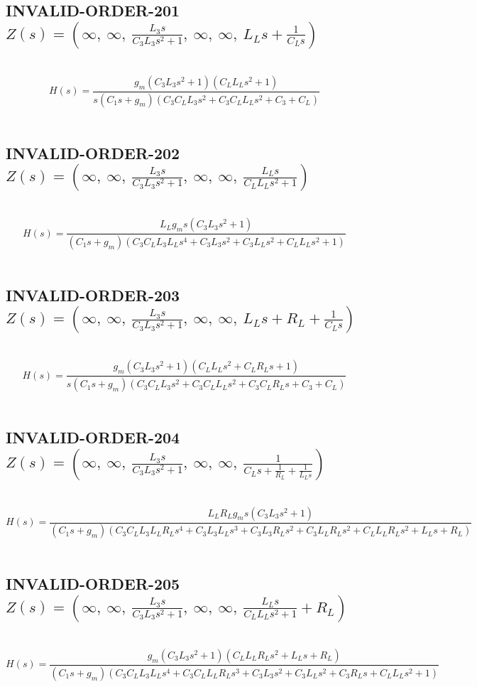 \documentclass{article}
\begin{document}
\subsection{INVALID-ORDER-201 $Z(s) = \left( \infty, \  \infty, \  \frac{L_{3} s}{C_{3} L_{3} s^{2} + 1}, \  \infty, \  \infty, \  L_{L} s + \frac{1}{C_{L} s}\right)$ } \ 
\textbf{\[H(s) = \frac{g_{m} \left(C_{3} L_{3} s^{2} + 1\right) \left(C_{L} L_{L} s^{2} + 1\right)}{s \left(C_{1} s + g_{m}\right) \left(C_{3} C_{L} L_{3} s^{2} + C_{3} C_{L} L_{L} s^{2} + C_{3} + C_{L}\right)}\] } \ 
\subsection{INVALID-ORDER-202 $Z(s) = \left( \infty, \  \infty, \  \frac{L_{3} s}{C_{3} L_{3} s^{2} + 1}, \  \infty, \  \infty, \  \frac{L_{L} s}{C_{L} L_{L} s^{2} + 1}\right)$ } \ 
\textbf{\[H(s) = \frac{L_{L} g_{m} s \left(C_{3} L_{3} s^{2} + 1\right)}{\left(C_{1} s + g_{m}\right) \left(C_{3} C_{L} L_{3} L_{L} s^{4} + C_{3} L_{3} s^{2} + C_{3} L_{L} s^{2} + C_{L} L_{L} s^{2} + 1\right)}\] } \ 
\subsection{INVALID-ORDER-203 $Z(s) = \left( \infty, \  \infty, \  \frac{L_{3} s}{C_{3} L_{3} s^{2} + 1}, \  \infty, \  \infty, \  L_{L} s + R_{L} + \frac{1}{C_{L} s}\right)$ } \ 
\textbf{\[H(s) = \frac{g_{m} \left(C_{3} L_{3} s^{2} + 1\right) \left(C_{L} L_{L} s^{2} + C_{L} R_{L} s + 1\right)}{s \left(C_{1} s + g_{m}\right) \left(C_{3} C_{L} L_{3} s^{2} + C_{3} C_{L} L_{L} s^{2} + C_{3} C_{L} R_{L} s + C_{3} + C_{L}\right)}\] } \ 
\subsection{INVALID-ORDER-204 $Z(s) = \left( \infty, \  \infty, \  \frac{L_{3} s}{C_{3} L_{3} s^{2} + 1}, \  \infty, \  \infty, \  \frac{1}{C_{L} s + \frac{1}{R_{L}} + \frac{1}{L_{L} s}}\right)$ } \ 
\textbf{\[H(s) = \frac{L_{L} R_{L} g_{m} s \left(C_{3} L_{3} s^{2} + 1\right)}{\left(C_{1} s + g_{m}\right) \left(C_{3} C_{L} L_{3} L_{L} R_{L} s^{4} + C_{3} L_{3} L_{L} s^{3} + C_{3} L_{3} R_{L} s^{2} + C_{3} L_{L} R_{L} s^{2} + C_{L} L_{L} R_{L} s^{2} + L_{L} s + R_{L}\right)}\] } \ 
\subsection{INVALID-ORDER-205 $Z(s) = \left( \infty, \  \infty, \  \frac{L_{3} s}{C_{3} L_{3} s^{2} + 1}, \  \infty, \  \infty, \  \frac{L_{L} s}{C_{L} L_{L} s^{2} + 1} + R_{L}\right)$ } \ 
\textbf{\[H(s) = \frac{g_{m} \left(C_{3} L_{3} s^{2} + 1\right) \left(C_{L} L_{L} R_{L} s^{2} + L_{L} s + R_{L}\right)}{\left(C_{1} s + g_{m}\right) \left(C_{3} C_{L} L_{3} L_{L} s^{4} + C_{3} C_{L} L_{L} R_{L} s^{3} + C_{3} L_{3} s^{2} + C_{3} L_{L} s^{2} + C_{3} R_{L} s + C_{L} L_{L} s^{2} + 1\right)}\] } \ 
\end{document}
